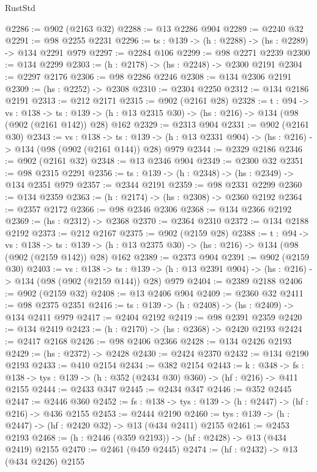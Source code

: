 \begin{lexlean}{RustStd}
\begin{coremodule}
@2286 := @902 (@2163 @32)
@2288 := @13 @2286 @904
@2289 := @2240 @32
@2291 := @98 @2255 @2231
@2296 := {ts : @139} -> (h : @2288) -> (hs : @2289) -> @134 @2291 @979
@2297 := @2284 @106
@2299 := @98 @2271 @2239
@2300 := @134 @2299
@2303 := (h : @2178) -> (hs : @2248) -> @2300 @2191
@2304 := @2297 @2176
@2306 := @98 @2286 @2246
@2308 := @134 @2306 @2191
@2309 := (hs : @2252) -> @2308
@2310 := @2304 @2250
@2312 := @134 @2186 @2191
@2313 := @212 @2171
@2315 := @902 (@2161 @28)
@2328 := {t : @94} ->
  {vs : @138} ->
  {ts : @139} -> (h : @13 @2315 @30) -> (hs : @216) -> @134 (@98 (@902 (@2161 @142)) @28) @162
@2329 := @2313 @904
@2331 := @902 (@2161 @30)
@2343 := {vs : @138} ->
  {ts : @139} -> (h : @13 @2331 @904) -> (hs : @216) -> @134 (@98 (@902 (@2161 @144)) @28) @979
@2344 := @2329 @2186
@2346 := @902 (@2161 @32)
@2348 := @13 @2346 @904
@2349 := @2300 @32
@2351 := @98 @2315 @2291
@2356 := {ts : @139} -> (h : @2348) -> (hs : @2349) -> @134 @2351 @979
@2357 := @2344 @2191
@2359 := @98 @2331 @2299
@2360 := @134 @2359
@2363 := (h : @2174) -> (hs : @2308) -> @2360 @2192
@2364 := @2357 @2172
@2366 := @98 @2346 @2306
@2368 := @134 @2366 @2192
@2369 := (hs : @2312) -> @2368
@2370 := @2364 @2310
@2372 := @134 @2188 @2192
@2373 := @212 @2167
@2375 := @902 (@2159 @28)
@2388 := {t : @94} ->
  {vs : @138} ->
  {ts : @139} -> (h : @13 @2375 @30) -> (hs : @216) -> @134 (@98 (@902 (@2159 @142)) @28) @162
@2389 := @2373 @904
@2391 := @902 (@2159 @30)
@2403 := {vs : @138} ->
  {ts : @139} -> (h : @13 @2391 @904) -> (hs : @216) -> @134 (@98 (@902 (@2159 @144)) @28) @979
@2404 := @2389 @2188
@2406 := @902 (@2159 @32)
@2408 := @13 @2406 @904
@2409 := @2360 @32
@2411 := @98 @2375 @2351
@2416 := {ts : @139} -> (h : @2408) -> (hs : @2409) -> @134 @2411 @979
@2417 := @2404 @2192
@2419 := @98 @2391 @2359
@2420 := @134 @2419
@2423 := (h : @2170) -> (hs : @2368) -> @2420 @2193
@2424 := @2417 @2168
@2426 := @98 @2406 @2366
@2428 := @134 @2426 @2193
@2429 := (hs : @2372) -> @2428
@2430 := @2424 @2370
@2432 := @134 @2190 @2193
@2433 := @410 @2154
@2434 := @382 @2154
@2443 := {k : @348} ->
  {fs : @138} -> {tys : @139} -> (h : @352 (@2434 @30) @360) -> (hf : @216) -> @411 @2155
@2444 := @2433 @347
@2445 := @2434 @347
@2446 := @352 @2445
@2447 := @2446 @360
@2452 := {fs : @138} -> {tys : @139} -> (h : @2447) -> (hf : @216) -> @436 @2155
@2453 := @2444 @2190
@2460 := {tys : @139} -> (h : @2447) -> (hf : @2420 @32) -> @13 (@434 @2411) @2155
@2461 := @2453 @2193
@2468 := (h : @2446 (@359 @2193)) -> (hf : @2428) -> @13 (@434 @2419) @2155
@2470 := @2461 (@459 @2445)
@2474 := (hf : @2432) -> @13 (@434 @2426) @2155

\end{coremodule}
\end{lexlean}
